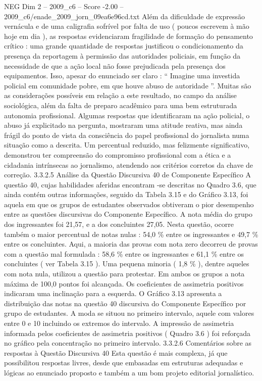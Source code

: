 \begin{textsample}{NEG Dim 2 – 2009\_c6 – Score -2.00 – 2009\_c6/enade\_2009\_jorn\_09ea6e96cd.txt}
Além da dificuldade de expressão vernácula e de uma caligrafia sofrível por falta de uso ( poucos escrevem à mão hoje em dia ), as respostas evidenciaram fragilidade de formação do pensamento crítico : uma grande quantidade de respostas justificou o condicionamento da presença da reportagem à permissão das autoridades policiais, em função da necessidade de que a ação local não fosse prejudicada pela presença dos equipamentos.
Isso, apesar do enunciado ser claro : “ Imagine uma investida policial em comunidade pobre, em que houve abuso de autoridade ”.
Muitas são as considerações possíveis em relação a este resultado, no campo da análise sociológica, além da falta de preparo acadêmico para uma bem estruturada autonomia profissional.
Algumas respostas que identificaram na ação policial, o abuso já explicitado na pergunta, mostraram uma atitude reativa, mas ainda frágil do ponto de vista da consciência do papel profissional do jornalista numa situação como a descrita.
Um percentual reduzido, mas felizmente significativo, demonstrou ter compreensão do compromisso profissional com a ética e a cidadania intrínsecas ao jornalismo, atendendo aos critérios corretos da chave de correção. 3.3.2.5 Análise da Questão Discursiva 40 de Componente Específico A questão 40, cujas habilidades aferidas encontram -se descritas no Quadro 3.6, que ainda contém outras informações, seguido da Tabela 3.15 e do Gráfico 3.13, foi aquela em que os grupos de estudantes observados obtiveram o pior desempenho entre as questões discursivas do Componente Específico.
A nota média do grupo dos ingressantes foi 21,57, e a dos concluintes 27,05.
Nesta questão, ocorre também o maior percentual de notas nulas : 54,0 \% entre os ingressantes e 49,7 \% entre os concluintes.
Aqui, a maioria das provas com nota zero decorreu de provas com a questão mal formulada : 58,6 \% entre os ingressantes e 61,1 \% entre os concluintes ( ver Tabela 3.15 ).
Uma pequena minoria ( 1,8 \% ), dentre aqueles com nota nula, utilizou a questão para protestar.
Em ambos os grupos a nota máxima de 100,0 pontos foi alcançada.
Os coeficientes de assimetria positivos indicaram uma inclinação para a esquerda.
O Gráfico 3.13 apresenta a distribuição das notas na questão 40 discursiva do Componente Específico por grupo de estudantes.
A moda se situou no primeiro intervalo, aquele com valores entre 0 e 10 incluindo os extremos do intervalo.
A impressão de assimetria informada pelos coeficientes de assimetria positivos ( Quadro 3.6 ) foi reforçada no gráfico pela concentração no primeiro intervalo. 3.3.2.6 Comentários sobre as respostas à Questão Discursiva 40 Esta questão é mais complexa, já que possibilitou respostas livres, desde que embasadas em estruturas adequadas e lógicas ao enunciado proposto e também a um bom projeto editorial jornalístico.

\end{textsample}
